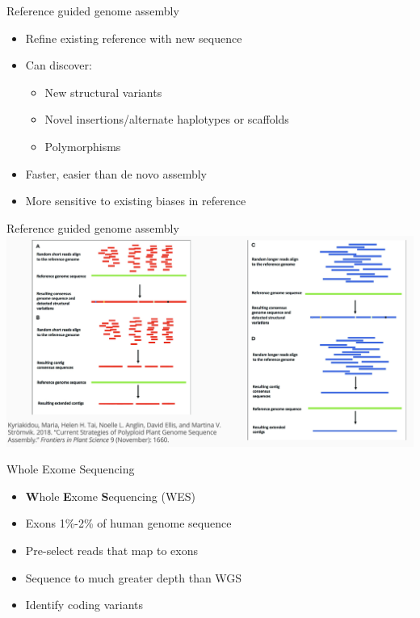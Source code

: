 \documentclass[
  ignorenonframetext,
]{beamer}
\providecommand{\tightlist}{%
  \setlength{\itemsep}{0pt}\setlength{\parskip}{0pt}}
\begin{document}
\begin{frame}{Reference guided genome assembly}
\label{reference-guided-genome-assembly}
\Large

\begin{itemize}
\tightlist
\item
  Refine existing reference with new sequence
\item
  Can discover:

  \begin{itemize}
  \tightlist
  \item
    New structural variants
  \item
    Novel insertions/alternate haplotypes or scaffolds
  \item
    Polymorphisms
  \end{itemize}
\item
  Faster, easier than de novo assembly
\item
  More sensitive to existing biases in reference
\end{itemize}
\end{frame}

\begin{frame}{Reference guided genome assembly}
\label{reference-guided-genome-assembly-1}
\includegraphics{figs/reference_assemble.png}
\end{frame}

\begin{frame}{Whole Exome Sequencing}
\label{whole-exome-sequencing}
\Large

\begin{itemize}
\tightlist
\item
  \textbf{W}hole \textbf{E}xome \textbf{S}equencing (WES)
\item
  Exons 1\%-2\% of human genome sequence
\item
  Pre-select reads that map to exons
\item
  Sequence to much greater depth than WGS
\item
  Identify coding variants
\end{itemize}
\end{frame}
\end{document}
